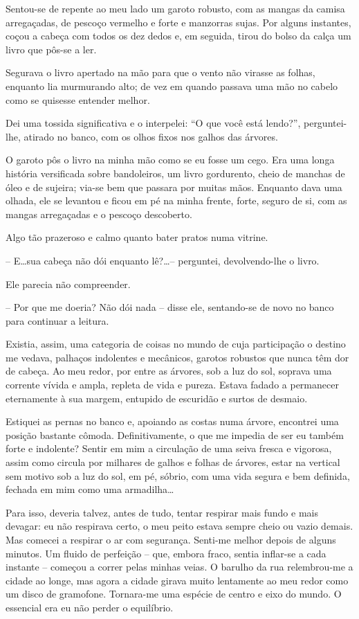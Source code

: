 Sentou-se de repente ao meu lado um garoto robusto, com as mangas da camisa arregaçadas, de pescoço vermelho e forte e manzorras sujas. Por alguns instantes, coçou a cabeça com todos os dez dedos e, em seguida, tirou do bolso da calça um livro que pôs-se a ler.

Segurava o livro apertado na mão para que o vento não virasse as folhas, enquanto lia murmurando alto; de vez em quando passava uma mão no cabelo como se quisesse entender melhor.

Dei uma tossida significativa e o interpelei: ``O que você está lendo?'', perguntei-lhe, atirado no banco, com os olhos fixos nos galhos das árvores.

O garoto pôs o livro na minha mão como se eu fosse um cego. Era uma longa história versificada sobre bandoleiros, um livro gordurento, cheio de manchas de óleo e de sujeira; via-se bem que passara por muitas mãos. Enquanto dava uma olhada, ele se levantou e ficou em pé na minha frente, forte, seguro de si, com as mangas arregaçadas e o pescoço descoberto.

Algo tão prazeroso e calmo quanto bater pratos numa vitrine.

-- E\dots sua cabeça não dói enquanto lê?\dots -- perguntei, devolvendo-lhe o livro.

Ele parecia não compreender.

-- Por que me doeria? Não dói nada -- disse ele, sentando-se de novo no banco para continuar a leitura.

Existia, assim, uma categoria de coisas no mundo de cuja participação o destino me vedava, palhaços indolentes e mecânicos, garotos robustos que nunca têm dor de cabeça. Ao meu redor, por entre as árvores, sob a luz do sol, soprava uma corrente vívida e ampla, repleta de vida e pureza. Estava fadado a permanecer eternamente à sua margem, entupido de escuridão e surtos de desmaio.

Estiquei as pernas no banco e, apoiando as costas numa árvore, encontrei uma posição bastante cômoda. Definitivamente, o que me impedia de ser eu também forte e indolente? Sentir em mim a circulação de uma seiva fresca e vigorosa, assim como circula por milhares de galhos e folhas de árvores, estar na vertical sem motivo sob a luz do sol, em pé, sóbrio, com uma vida segura e bem definida, fechada em mim como uma armadilha\dots

Para isso, deveria talvez, antes de tudo, tentar respirar mais fundo e mais devagar: eu não respirava certo, o meu peito estava sempre cheio ou vazio demais. Mas comecei a respirar o ar com segurança. Senti-me melhor depois de alguns minutos. Um fluido de perfeição -- que, embora fraco, sentia inflar-se a cada instante -- começou a correr pelas minhas veias. O barulho da rua relembrou-me a cidade ao longe, mas agora a cidade girava muito lentamente ao meu redor como um disco de gramofone. Tornara-me uma espécie de centro e eixo do mundo. O essencial era eu não perder o equilíbrio.

